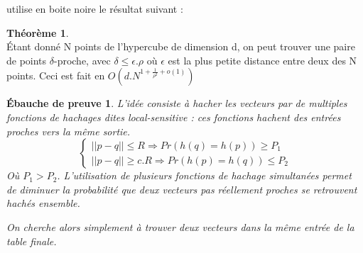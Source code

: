 \documentclass{article}		%
\theoremstyle{definition}
\newtheorem{theo}{Théorème}
\theoremstyle{plain}
\newtheorem{intui}{Ébauche de preuve}
\theoremstyle{plain}
\theoremstyle{plain}
\theoremstyle{plain}
\theoremstyle{plain}
\begin{document}
\cite{Grigo} utilise en boite noire le résultat suivant :
\begin{framed}
\begin{theo}\cite{Indyk}
            \\ Étant donné N points de l'hypercube de dimension d, on peut
      trouver une paire de points $\delta$-proche, avec $\delta \leq
      \epsilon.\rho$ où $\epsilon$ est la plus petite distance entre deux
       des N points. Ceci est fait en $O(d.N^{1+\frac{1}{\rho^2}+o(1)})$
\end{theo}
\begin{intui}

L'idée consiste à hacher les vecteurs par de multiples fonctions de
hachages dites \emph{local-sensitive} : ces fonctions hachent des entrées
proches vers la même sortie. $$\begin{cases} ||p-q||\leq R \Rightarrow
Pr(h(q)=h(p))\geq P_1 \\||p-q||\geq c.R \Rightarrow Pr(h(p)=h(q))\leq P_2
\end{cases} $$ Où  $P_1 > P_2$. L'utilisation de plusieurs fonctions de
hachage simultanées permet de diminuer la probabilité que deux vecteurs
pas réellement proches se retrouvent hachés ensemble.

On cherche
alors simplement à trouver deux vecteurs dans la même entrée de la table
finale.  
\end{intui}
\end{framed}
\end{document}
